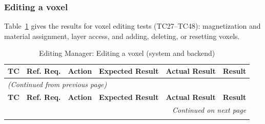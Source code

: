 \documentclass[12pt, titlepage]{article}
\begin{document}
\subsubsection{Editing a voxel}
Table~\ref{table:em_voxel_tests} gives the results for voxel editing tests (TC27--TC48): magnetization and material assignment, layer access, and adding, deleting, or resetting voxels.

\begin{longtable}{c
    >{\raggedright\arraybackslash}p{1.5cm}
    >{\raggedright\arraybackslash}p{3cm}
    >{\raggedright\arraybackslash}p{3cm}
  >{\raggedright\arraybackslash}p{4.5cm} c}
  \caption{Editing Manager: Editing a voxel (system and backend)}
  \label{table:em_voxel_tests} \\
  \toprule
  \textbf{TC} & \textbf{Ref. Req.} & \textbf{Action} &
  \textbf{Expected Result} & \textbf{Actual Result} & \textbf{Result} \\
  \midrule
  \endfirsthead

  \multicolumn{6}{l}{\textit{(Continued from previous page)}} \\
  \toprule
  \textbf{TC} & \textbf{Ref. Req.} & \textbf{Action} &
  \textbf{Expected Result} & \textbf{Actual Result} & \textbf{Result} \\
  \midrule
  \endhead

  \multicolumn{6}{r}{\textit{Continued on next page}} \\
  \endfoot

  \bottomrule
  \endlastfoot


\end{longtable}
\end{document}

